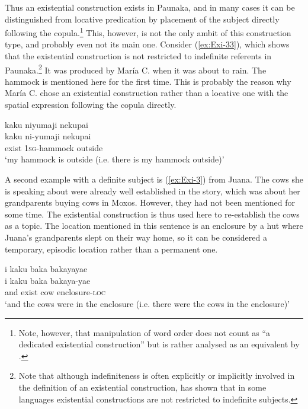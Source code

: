 Thus an existential construction exists in Paunaka, and in many cases it can be distinguished from locative predication by placement of the subject directly following the copula.\footnote{Note, however, that manipulation of word order does not count as “a dedicated existential construction” but is rather analysed as an equivalent by \citet[19]{Creissels2014a}.} This, however, is not the only ambit of this construction type, and probably even not its main one. Consider (\ref{ex:Exi-33}), which shows that the existential construction is not restricted to indefinite referents in Paunaka.\footnote{Note that although indefiniteness is often explicitly or implicitly involved in the definition of an existential construction, \citet[4]{Creissels2014a} has shown that in some languages existential constructions are not restricted to indefinite subjects.} It was produced by María C. when it was about to rain. The hammock is mentioned here for the first time. This is probably the reason why María C. chose an existential construction rather than a locative one with the spatial expression following the copula directly.

\ea\label{ex:Exi-33}
\begingl
\glpreamble kaku niyumaji nekupai\\
\gla kaku ni-yumaji nekupai\\
\glb exist 1\textsc{sg}-hammock outside\\
\glft ‘my hammock is outside (i.e. there is my hammock outside)’
\endgl
\trailingcitation{[cux-120410ls.258]}
\xe

A second example with a definite subject is (\ref{ex:Exi-3}) from Juana. The cows she is speaking about were already well established in the story, which was about her grandparents buying cows in Moxos. However, they had not been mentioned for some time. The existential construction is thus used here to re-establish the cows as a topic. The location mentioned in this sentence is an enclosure by a hut where Juana’s grandparents slept on their way home, so it can be considered a temporary, episodic location rather than a permanent one.

\ea\label{ex:Exi-3}
\begingl
\glpreamble i kaku baka bakayayae\\
\gla i kaku baka bakaya-yae\\
\glb and exist cow enclosure-\textsc{loc}\\
\glft ‘and the cows were in the enclosure (i.e. there were the cows in the enclosure)’
\endgl
\trailingcitation{[jxx-p151016l-2.185]}
\xe



